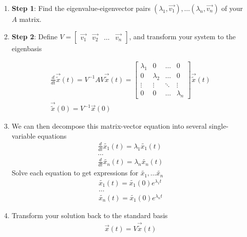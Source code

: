 \begin{enumerate}
    \item \textbf{Step 1}: Find the eigenvalue-eigenvector pairs $(\lambda_1, \vec{v_1}), \dots (\lambda_n, \vec{v_n})$ of your $A$ matrix.
    \item \textbf{Step 2}: Define $V = \begin{bmatrix}
        \vec{v_1} & \vec{v_2} & \dots & \vec{v_n}
    \end{bmatrix}$, and transform your system to the eigenbasis

    \begin{align*}
    \frac{d}{dt} \vec{\widetilde{x}}(t) =  V^{-1}AV \vec{\widetilde{x}}(t) =
    \begin{bmatrix}
        \lambda_1 & 0 & \dots & 0 \\
        0 & \lambda_2 & \dots & 0 \\
        \vdots & \vdots & \ddots & \vdots \\
        0 & 0 & \dots & \lambda_n
    \end{bmatrix} \vec{\widetilde{x}}(t) \\
    \vec{\widetilde{x}}(0) = V^{-1} \vec{x}(0)
    \end{align*}

    \item We can then decompose this matrix-vector equation into several single-variable equations
    \begin{align*}
        \frac{d}{dt} \widetilde{x_1}(t) = \lambda_1 \widetilde{x_1}(t) \\
        \dots \\
        \frac{d}{dt} \widetilde{x_n}(t) = \lambda_n \widetilde{x_n}(t)
    \end{align*}
    Solve each equation to get expressions for $\widetilde{x_1}, \dots \widetilde{x_n}$
    \begin{align*}
        \widetilde{x_1}(t) = \widetilde{x_1}(0) e^{\lambda_1 t} \\
        \dots \\
        \widetilde{x_n}(t) = \widetilde{x_1}(0) e^{\lambda_n t} 
    \end{align*}

    \item Transform your solution back to the standard basis
    \begin{align*}
        \vec{x}(t) = V \vec{\widetilde{x}}(t)
    \end{align*}

\end{enumerate}

